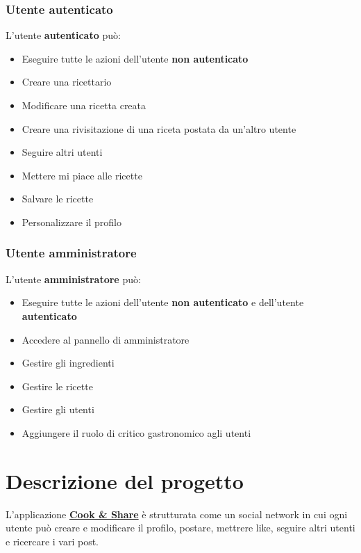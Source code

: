 \documentclass[a4paper]{article}
\begin{document}
            \subsubsection{Utente autenticato}
                L'utente \textbf{autenticato} può:
                \begin{itemize}
                    \item Eseguire tutte le azioni dell'utente \textbf{non autenticato}
                    \item Creare una ricettario
                    \item Modificare una ricetta creata
                    \item Creare una rivisitazione di una riceta postata da un'altro utente
                    \item Seguire altri utenti
                    \item Mettere mi piace alle ricette
                    \item Salvare le ricette
                    \item Personalizzare il profilo
                \end{itemize}
            
            
            \subsubsection{Utente amministratore}
                L'utente \textbf{amministratore} può:
                \begin{itemize}
                    \item Eseguire tutte le azioni dell'utente \textbf{non autenticato} e dell'utente \textbf{autenticato}
                    \item Accedere al pannello di amministratore
                    \item Gestire gli ingredienti
                    \item Gestire le ricette
                    \item Gestire gli utenti
                    \item Aggiungere il ruolo di critico gastronomico agli utenti
                \end{itemize}
    
    
    \newpage
    \section{Descrizione del progetto}
        L'applicazione \href{https://github.com/LinkIT3/Cook_and_Share}{\textbf{Cook \& Share}} è strutturata come un social network in cui ogni utente può creare e modificare il profilo,
        postare, mettrere like, seguire altri utenti e ricercare i vari post.
        
\end{document}
